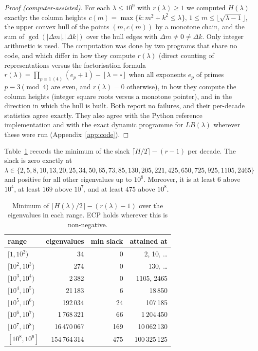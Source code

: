 \documentclass[11pt]{amsart}
\theoremstyle{definition}
\theoremstyle{remark}
\newcommand{\SweepX}{10^9}
\numberwithin{equation}{section}
\begin{document}
\begin{proof}[Proof (computer-assisted)]
For each $\lambda\le\SweepX$ with $r(\lambda)\ge1$ we computed $H(\lambda)$ exactly: the
column heights $c(m)=\max\{k:m^2+k^2\le\lambda\}$, $1\le m\le\lfloor\sqrt{\lambda-1}\rfloor$,
the upper convex hull of the points $(m,c(m))$ by a monotone chain, and the sum of
$\gcd(|\Delta m|,|\Delta k|)$ over the hull edges with $\Delta m\ne0\ne\Delta k$. Only integer
arithmetic is used. The computation was done by two programs that share no code, and which
differ in how they compute $r(\lambda)$ (direct counting of representations versus the
factorisation formula $r(\lambda)=\prod_{p\equiv1\,(4)}(e_p+1)-[\lambda=\square]$ when all
exponents $e_p$ of primes $p\equiv3\pmod 4$ are even, and $r(\lambda)=0$ otherwise), in how they
compute the column heights (integer square roots versus a monotone pointer), and in the
direction in which the hull is built. Both report no failures, and their per-decade statistics
agree exactly. They also agree with the Python reference implementation and with the exact
dynamic programme for $LB(\lambda)$ wherever these were run (Appendix~\ref{app:code}).
\end{proof}

Table~\ref{tab:slack} records the minimum of the slack $\lceil H/2\rceil-(r-1)$ per decade.
The slack is zero exactly at $\lambda\in\{2,5,8,10,13,20,25,34,50,65,73,85,130,205,221,425,650,
725,925,1105,2465\}$ and positive for all other eigenvalues up to $\SweepX$. Moreover, it is at least
$6$ above $10^4$, at least $169$ above $10^7$, and at least $475$ above $10^8$.

\begin{table}[t]
\centering
\begin{tabular}{lrrr}
\toprule
range & eigenvalues & min slack & attained at\\
\midrule
$[1,10^2)$ & 34 & 0 & 2, 10, \dots\\
$[10^2,10^3)$ & 274 & 0 & 130, \dots\\
$[10^3,10^4)$ & 2\,382 & 0 & 1105, 2465\\
$[10^4,10^5)$ & 21\,183 & 6 & 18\,850\\
$[10^5,10^6)$ & 192\,034 & 24 & 107\,185\\
$[10^6,10^7)$ & 1\,768\,321 & 66 & 1\,204\,450\\
$[10^7,10^8)$ & 16\,470\,067 & 169 & 10\,062\,130\\
$[10^8,10^9]$ & 154\,764\,314 & 475 & 100\,325\,125\\
\bottomrule
\end{tabular}
\medskip
\caption{Minimum of $\lceil H(\lambda)/2\rceil-(r(\lambda)-1)$ over the eigenvalues in each range.
ECP holds wherever this is non-negative.}
\label{tab:slack}
\end{table}
\end{document}
